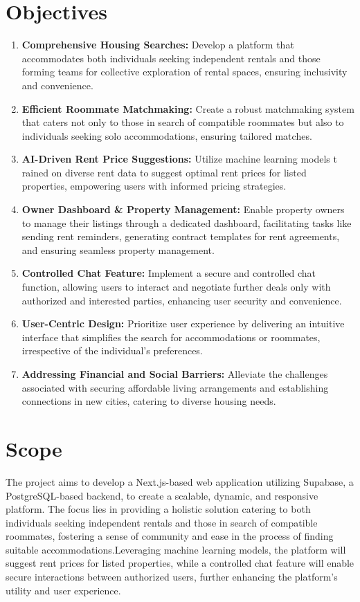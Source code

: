 \section{Objectives}
\begin{enumerate}
      \item \textbf{Comprehensive Housing Searches:} Develop a platform that accommodates
            both individuals seeking independent rentals and those forming teams for
            collective exploration of rental spaces, ensuring inclusivity and
            convenience.
      \item \textbf{Efficient Roommate Matchmaking:} Create a robust matchmaking system
            that caters not only to those in search of compatible roommates but also to
            individuals seeking solo accommodations, ensuring tailored matches.
      \item \textbf{AI-Driven Rent Price Suggestions:} Utilize machine learning models t
            rained on diverse rent data to suggest optimal rent prices for listed
            properties, empowering users with informed pricing strategies.
      \item \textbf{Owner Dashboard \& Property Management:} Enable property owners to manage their
            listings through a dedicated dashboard, facilitating tasks like sending rent
            reminders, generating contract templates for rent agreements, and ensuring seamless
            property management.
      \item \textbf{Controlled Chat Feature:} Implement a secure and controlled chat function, allowing
            users to interact and negotiate further deals only with authorized and interested
            parties, enhancing user security and convenience.
      \item \textbf{User-Centric Design:} Prioritize user experience by delivering an intuitive
            interface that simplifies the search for accommodations or roommates,
            irrespective of the individual's preferences.
      \item \textbf{Addressing Financial and Social Barriers:} Alleviate the challenges associated
            with securing affordable living arrangements and establishing connections in
            new cities, catering to diverse housing needs.
\end{enumerate}

\section{Scope}
The project aims to develop a Next.js-based web application utilizing Supabase, a PostgreSQL-based
backend, to create a scalable, dynamic, and responsive platform. The focus lies in providing a
holistic solution catering to both individuals seeking independent rentals and those in search
of compatible roommates, fostering a sense of community and ease in the process of finding suitable
accommodations.Leveraging machine learning models, the platform will suggest rent prices for listed
properties, while a controlled chat feature will enable secure interactions between authorized users,
further enhancing the platform's utility and user experience.
